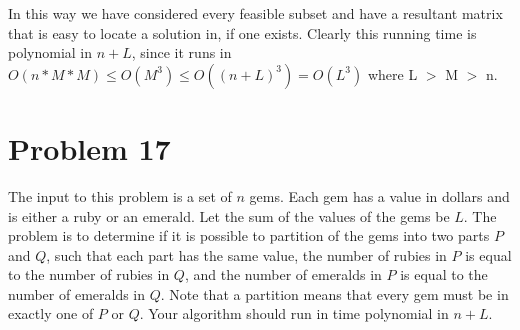 \documentclass{article}
\providecommand{\prob}[1]{\section*{Problem #1}}
\begin{document}
In this way we have considered every feasible subset and have a resultant matrix that is easy to locate a solution in, if one exists. Clearly this running time is polynomial in $n + L$, since it runs in $O\left(n*M*M\right) \leq O\left(M^3\right) \leq O\left(\left(n+L\right)^3\right) = O\left(L^3\right)$ where L $>$ M $>$ n.

\pagebreak
\prob{17}
The input to this problem is a set of $n$ gems. Each gem has a value in dollars and is either a ruby or an emerald. Let the sum of the values of the gems be $L$. The problem is to determine if it is possible to partition of the gems into two parts $P$ and $Q$, such that each part has the same value, the number of rubies in $P$ is equal to the number of rubies in $Q$, and the number of emeralds in $P$ is equal to the number of emeralds in $Q$. Note that a partition means that every gem must be in exactly one of $P$ or $Q$. Your algorithm should run in time polynomial in $n + L$.\par \medskip
\end{document}
